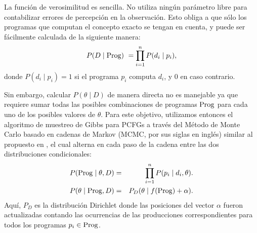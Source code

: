 
La función de verosimilitud es sencilla. No utiliza ningún parámetro libre para contabilizar errores de percepción en la observación. Esto obliga a que sólo los programas que computan el concepto exacto se tengan en cuenta, y puede ser fácilmente calculada de la siguiente manera:
\begin{equation}
\label{eqD}
P(D \mid {\rm Prog})\ = \prod\limits_{i = 1}^n P(d_i \mid p_i),
\end{equation}
donde $P(d_i \mid p_i) = 1 $ si el programa $p_i$ computa $d_i$, y 0 en caso contrario.


Sin embargo, calcular $P(\theta \mid D)$ de manera directa no es manejable ya que requiere sumar todas las posibles combinaciones de programas ${\rm Prog}$ para cada uno de los posibles valores de $\theta$. Para este objetivo, utilizamos entonces el algoritmo de muestreo de Gibbs \cite{geman1984stochastic} para PCFGs a través del Método de Monte Carlo basado en cadenas de Markov (MCMC, por sus siglas en inglés) similar al propuesto en \cite{johnson2007bayesian}, el cual alterna en cada paso de la cadena entre las dos distribuciones condicionales:
%
\begin{eqnarray}
\label{eqE}
P({\rm Prog} \mid \theta, D) &=& \prod\limits_{i=1}^n P(p_i \mid d_i, \theta).\\
P(\theta \mid {\rm Prog}, D) &=& P_D(\theta \mid f({\rm Prog}) + \alpha).
\end{eqnarray}
Aquí, $P_D$ es la distribución Dirichlet donde las posiciones del vector $\alpha$ fueron actualizadas contando las ocurrencias de las producciones correspondientes para todos los programas $p_i \in {\rm Prog}$.

